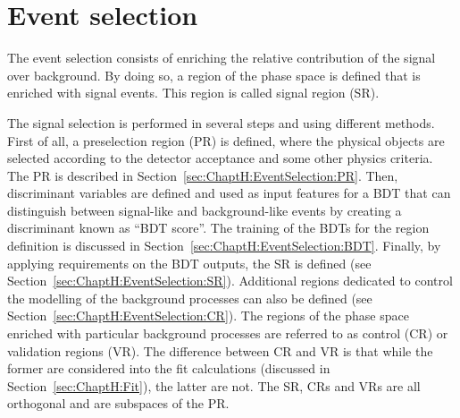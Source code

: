 


\section{Event selection}
\label{sec:ChaptH:EventSelection}
The event selection consists of enriching the relative contribution of the
signal over background. %
By doing so, a region of the phase space is defined
that is enriched with signal events. This region is called 
signal region (SR).


The signal selection is performed in several steps and using different methods. First of all, a 
preselection region (PR) is defined, where the physical objects are selected according to the detector acceptance and some other physics criteria.
The PR is described in Section~\ref{sec:ChaptH:EventSelection:PR}.
Then, discriminant variables are defined and used as input features for a BDT that  
can distinguish between signal-like and background-like events by creating a discriminant 
known as ``BDT score''. 
The training of the BDTs for the region definition is discussed in 
Section~\ref{sec:ChaptH:EventSelection:BDT}.
Finally, by applying requirements on the BDT outputs, the SR is 
defined (see Section~\ref{sec:ChaptH:EventSelection:SR}).
 Additional regions dedicated to control the modelling of the background processes
can also be defined (see Section~\ref{sec:ChaptH:EventSelection:CR}). 
The regions of the phase space enriched with
particular background processes are referred to as control (CR)
or validation regions (VR). 
The difference between CR and VR is that while the former
are considered into the fit calculations (discussed in Section~\ref{sec:ChaptH:Fit}), the latter are not.
The SR, CRs and VRs are all orthogonal and are subspaces of the PR.



